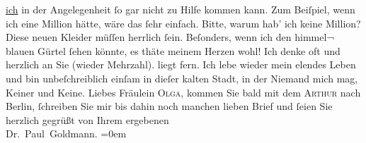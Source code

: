 \begin{ledgroupsized}[t]{13cm}
                  \uline{ich} in der Angelegenheit ſo gar nicht zu Hilfe
               kommen kann. Zum Beiſpiel, wenn ich eine Million hätte, wäre das ſehr einfach. Bitte,
               warum hab’ ich keine Million?\pend
           \pstart
           Diese neuen Kleider müſſen herrlich ſein. Beſonders, wenn ich den himmel¬ blauen
               Gürtel ſehen könnte, es thäte meinem Herzen wohl!\pend
           \pstart
           Ich denke oft und herzlich an Sie (wieder Mehrzahl). \label{K_L03086-177v}\label{K_L03086-177h} liegt fern. Ich lebe wieder mein elendes Leben und bin unbeſchreiblich einſam
               in dieſer kalten Stadt, in der
               Niemand mich mag, Keiner und Keine.\pend
           \pstart
           {\pb}Liebes Fräulein \textsc{Olga},
               kommen Sie bald mit dem \textsc{Arthur} nach Berlin, ſchreiben Sie mir bis dahin noch manchen lieben Brief
               und ſeien Sie herzlich gegrüßt von\pend
           \pstart
            Ihrem ergebenen{\\[\baselineskip]}\spacefill\mbox{Dr. Paul Goldmann.}\pend
           \leftskip=0em{}
         
         \endnumbering{}\end{ledgroupsized}  \newcommand{\dateiname}{L03086}\newcommand{\titel}{Paul Goldmann an Arthur Schnitzler, Olga und Elisabeth Gussmann, 27. 9. [1901]}\newcommand{\editorInnen}{Martin Anton Müller und Laura Untner}
      